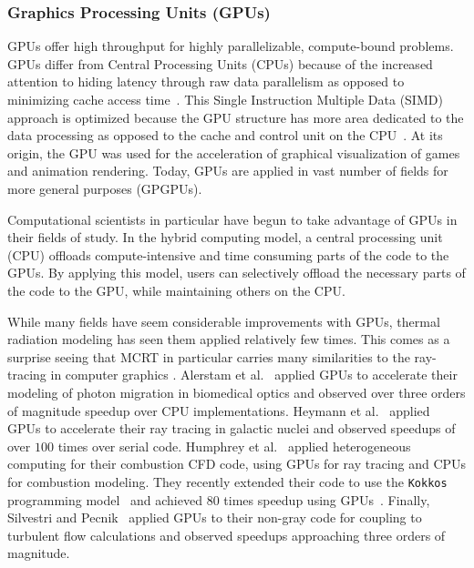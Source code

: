 \subsubsection{Graphics Processing Units (GPUs)}
GPUs offer high throughput for highly parallelizable, compute-bound problems.
GPUs differ from Central Processing Units (CPUs) because of the increased attention to hiding latency through raw data parallelism as opposed to minimizing cache access time~\cite{Caulfield2009WhatsGPU}. 
This Single Instruction Multiple Data (SIMD) approach is optimized because the GPU structure has more area dedicated to the data processing as opposed to the cache and control unit on the CPU~\cite{Gupta2020CUDAComputing}.
At its origin, the GPU was used for the acceleration of graphical visualization of games and animation rendering. Today, GPUs are applied in vast number of fields for more general purposes (GPGPUs).

Computational scientists in particular have begun to take advantage of GPUs in their fields of study. In the hybrid computing model, a central processing unit (CPU) offloads compute-intensive and time consuming parts of the code to the GPUs.
By applying this model, users can selectively offload the necessary parts of the code to the GPU, while maintaining others on the CPU.

While many fields have seem considerable improvements with GPUs, thermal radiation modeling has seen them applied relatively few times. This comes as a surprise seeing that MCRT in particular carries many similarities to the ray-tracing in computer graphics \cite{Zeeb2001AnGeometries}.
Alerstam et al.~\cite{Alerstam2008ParallelMigration} applied GPUs to accelerate their modeling of photon migration in biomedical optics and observed over three orders of magnitude speedup over CPU implementations. Heymann et al.~\cite{Heymann2012GPU-basedAGN} applied GPUs to accelerate their ray tracing in galactic nuclei and observed speedups of over $100$ times over serial code. Humphrey et al.~\cite{Humphrey2012RadiationSystem} applied heterogeneous computing for their combustion CFD code, using GPUs for ray tracing and CPUs for combustion modeling. They recently extended their code to use the \texttt{Kokkos} programming model~\cite{Trott_Kokkos3_2022} and achieved $80$ times speedup using GPUs~\cite{Holmen2017ImprovingTasks}. Finally, Silvestri and Pecnik~\citep{Silvestri2019ASimulation} applied GPUs to their non-gray code for coupling to turbulent flow calculations and observed speedups approaching three orders of magnitude.

